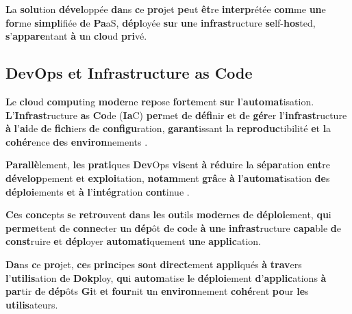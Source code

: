 \documentclass{rapportClass} %
\begin{document}
\textbf{L}a \textbf{solu}tion \textbf{dével}oppée \textbf{da}ns \textbf{c}e \textbf{pro}jet \textbf{pe}ut \textbf{êt}re \textbf{interp}rétée \textbf{com}me \textbf{un}e
\textbf{for}me \textbf{simpl}ifiée \textbf{d}e \textbf{Pa}aS, \textbf{dépl}oyée \textbf{su}r \textbf{un}e \textbf{infrast}ructure
\textbf{se}lf-\textbf{hos}ted, \textbf{s}’\textbf{appare}ntant \textbf{à} \textbf{u}n \textbf{clo}ud \textbf{pri}vé.

\subsection{DevOps et Infrastructure as Code}

\textbf{L}e \textbf{clo}ud \textbf{compu}ting \textbf{mode}rne \textbf{rep}ose \textbf{forte}ment \textbf{su}r \textbf{l}’\textbf{automat}isation.
\textbf{L}’\textbf{Infrast}ructure \textbf{a}s \textbf{Co}de (\textbf{Ia}C) \textbf{per}met \textbf{d}e \textbf{défi}nir \textbf{e}t \textbf{d}e \textbf{gér}er
\textbf{l}’\textbf{infrast}ructure \textbf{à} \textbf{l}’\textbf{ai}de \textbf{d}e \textbf{fich}iers \textbf{d}e \textbf{configu}ration, \textbf{garant}issant
\textbf{l}a \textbf{reproduc}tibilité \textbf{e}t \textbf{l}a \textbf{cohér}ence \textbf{de}s \textbf{environ}nements \cite{Morris2016}.

\textbf{Parallè}lement, \textbf{le}s \textbf{prati}ques \textbf{Dev}Ops \textbf{vis}ent \textbf{à} \textbf{rédu}ire \textbf{l}a \textbf{sépar}ation
\textbf{ent}re \textbf{dévelop}pement \textbf{e}t \textbf{exploi}tation, \textbf{notam}ment \textbf{grâ}ce \textbf{à}
\textbf{l}’\textbf{automat}isation \textbf{de}s \textbf{déploi}ements \textbf{e}t \textbf{à} \textbf{l}’\textbf{intégr}ation \textbf{cont}inue
\cite{Bass2015}.

\textbf{Ce}s \textbf{conc}epts \textbf{s}e \textbf{retro}uvent \textbf{da}ns \textbf{le}s \textbf{out}ils \textbf{mode}rnes \textbf{d}e \textbf{déploi}ement,
\textbf{qu}i \textbf{perme}ttent \textbf{d}e \textbf{conne}cter \textbf{u}n \textbf{dép}ôt \textbf{d}e \textbf{co}de \textbf{à} \textbf{un}e \textbf{infrast}ructure
\textbf{capa}ble \textbf{d}e \textbf{const}ruire \textbf{e}t \textbf{dépl}oyer \textbf{automati}quement \textbf{un}e \textbf{applic}ation.

\textbf{Da}ns \textbf{c}e \textbf{pro}jet, \textbf{ce}s \textbf{princ}ipes \textbf{so}nt \textbf{direct}ement \textbf{appli}qués \textbf{à} \textbf{trav}ers
\textbf{l}’\textbf{utilis}ation \textbf{d}e \textbf{Dokp}loy, \textbf{qu}i \textbf{autom}atise \textbf{l}e \textbf{déploi}ement \textbf{d}’\textbf{applic}ations
\textbf{à} \textbf{par}tir \textbf{d}e \textbf{dép}ôts \textbf{Gi}t \textbf{e}t \textbf{four}nit \textbf{u}n \textbf{environ}nement \textbf{cohé}rent \textbf{po}ur \textbf{le}s
\textbf{utilis}ateurs.
\end{document}
